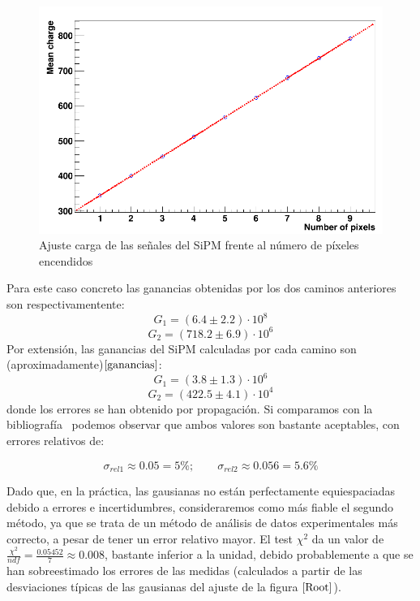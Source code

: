 \begin{enumerate}
\begin{enumerate}
	\begin{figure}[hbtp]
		\centering
		\includegraphics[scale=0.4]{FitPosicionPixels.png}
		\caption{Ajuste carga de las señales del SiPM frente al número de píxeles encendidos\label{ajuste}}
		\end{figure}
			
	\end{enumerate}
	
Para este caso concreto las ganancias obtenidas por los dos caminos anteriores son respectivamentente:
\begin{equation}
G_1= (6.4 \pm 2.2) \cdot 10^8
\label{gananciatotalmetodo1} 
\end{equation}
\begin{equation}
G_2= (718.2 \pm 6.9) \cdot 10^6
\label{gananciatotalmetodo2}
\end{equation}
Por extensión, las ganancias del SiPM calculadas por cada camino son (aproximadamente)$\eqref{ganancias}$: 
\begin{equation}
G_1= (3.8 \pm 1.3) \cdot 10^6
\label{gananciaSiPMmetodo1}
\end{equation}
\begin{equation}
G_2= (422.5 \pm 4.1) \cdot 10^4
\label{gananciaSiPMmetodo2}
\end{equation}
donde los errores se han obtenido por propagación. Si comparamos con la bibliografía~\cite{datasheet SiPM} podemos observar que ambos valores son bastante aceptables, con errores relativos de:

\begin{equation}
\sigma_{rel1} \approx 0.05 = 5\%; \qquad \sigma_{rel2} \approx 0.056 = 5.6\%
\label{erroresgananciasSiPM}
\end{equation}


Dado que, en la práctica, las gausianas no están perfectamente equiespaciadas debido a errores e incertidumbres, consideraremos como más fiable el segundo método, ya que se trata de un método de análisis de datos experimentales más correcto, a pesar de tener un error relativo mayor.
El test $\chi^2$ da un valor de  $\frac{\chi^2}{ndf}=\frac{0.05452}{7}\approx 0.008$, bastante inferior a la unidad, debido  probablemente a que se han sobreestimado los errores de las medidas (calculados a partir de las desviaciones típicas de las gausianas del ajuste de la figura $\ref{Root}$).

\end{enumerate}
